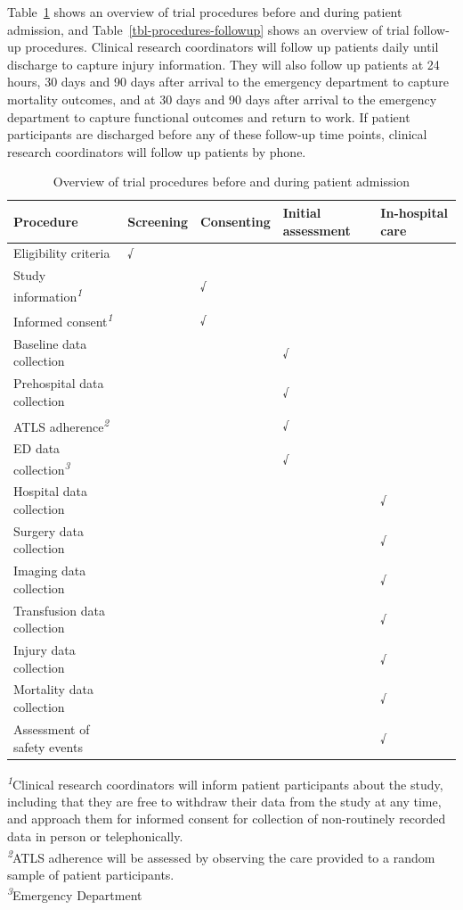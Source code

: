 \documentclass[
]{scrartcl}
\begin{document}
Table~\ref{tbl-procedures-baseline} shows an overview of trial
procedures before and during patient admission, and
Table~\ref{tbl-procedures-followup} shows an overview of trial follow-up
procedures. Clinical research coordinators will follow up patients daily
until discharge to capture injury information. They will also follow up
patients at 24 hours, 30 days and 90 days after arrival to the emergency
department to capture mortality outcomes, and at 30 days and 90 days
after arrival to the emergency department to capture functional outcomes
and return to work. If patient participants are discharged before any of
these follow-up time points, clinical research coordinators will follow
up patients by phone.

\hypertarget{tbl-procedures-baseline}{}
\setlength{\LTpost}{0mm}
\begin{longtable}{lllll}
\caption{\label{tbl-procedures-baseline}Overview of trial procedures before and during patient admission }\tabularnewline

\toprule
Procedure & Screening & Consenting & Initial assessment & In-hospital care \\ 
\midrule\addlinespace[2.5pt]
Eligibility criteria & √ &  &  &  \\ 
Study information\textsuperscript{\textit{1}} &  & √ &  &  \\ 
Informed consent\textsuperscript{\textit{1}} &  & √ &  &  \\ 
Baseline data collection &  &  & √ &  \\ 
Prehospital data collection &  &  & √ &  \\ 
ATLS adherence\textsuperscript{\textit{2}} &  &  & √ &  \\ 
ED data collection\textsuperscript{\textit{3}} &  &  & √ &  \\ 
Hospital data collection &  &  &  & √ \\ 
Surgery data collection &  &  &  & √ \\ 
Imaging data collection &  &  &  & √ \\ 
Transfusion data collection &  &  &  & √ \\ 
Injury data collection &  &  &  & √ \\ 
Mortality data collection &  &  &  & √ \\ 
Assessment of safety events &  &  &  & √ \\ 
\bottomrule
\end{longtable}
\begin{minipage}{\linewidth}
\textsuperscript{\textit{1}}Clinical research coordinators will inform patient participants about the study, including that they are free to withdraw their data from the study at any time, and approach them for informed consent for collection of non-routinely recorded data in person or telephonically.\\
\textsuperscript{\textit{2}}ATLS adherence will be assessed by observing the care provided to a random sample of patient participants.\\
\textsuperscript{\textit{3}}Emergency Department\\
\end{minipage}
\end{document}
